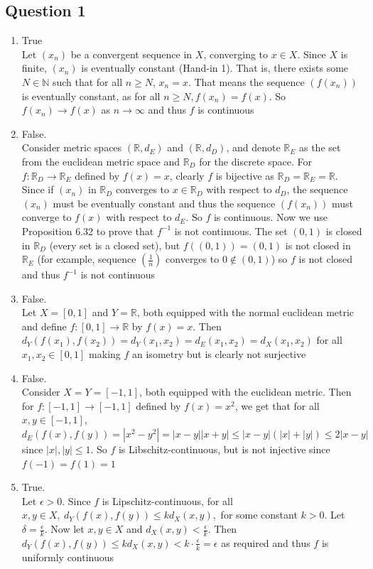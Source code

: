 \documentclass[letterpaper, 11pt]{article}
\newcommand{\R}{\mathbb{R}}   %
\newcommand{\N}{\mathbb{N}}   %
\newcommand{\1}{\mathds{1}}	%
\theoremstyle{definition}
\begin{document}
\subsection*{Question 1}

\begin{enumerate}[label=(\alph*)]
\item True \\Let $(x_n)$ be a convergent sequence in $X$, converging to $x\in X$. Since $X$ is finite, $(x_n)$ is eventually constant (Hand-in 1). That is, there exists some $N\in \N$ such that for all $n \ge N$, $x_n = x$. That means the sequence $(f(x_n))$ is eventually constant, as for all $n\ge N, f(x_n) = f(x)$. So $f(x_n) \to f(x)$ as $n \to \infty$ and thus $f$ is continuous

\item False. \\ Consider metric spaces $(\R, d_E)$ and $(\R, d_D)$, and denote $\R_E$ as the set from the euclidean metric space and $\R_D$ for the discrete space. For $f: \R_D \to \R_E$ defined by $f(x) = x$, clearly $f$ is bijective as $\R _D = \R_E = \R$. Since if $(x_n)$ in $\R_D$ converges to $x \in \R_D$ with respect to $d_D$, the sequence $(x_n)$ must be eventually constant and thus the sequence $(f(x_n))$ must converge to $f(x)$ with respect to $d_E$. So $f$ is continuous. Now we use Proposition 6.32 to prove that $f^{-1}$ is not continuous. The set $(0,1)$ is closed in $\R_D$ (every set is a closed set), but $f((0,1)) = (0,1)$ is not closed in $\R_E$ (for example, sequence $(\frac{1}{n})$ converges to $0 \notin (0,1)$) so $f$ is not closed and thus $f^{-1}$ is not continuous

\item False. \\Let $X = [0,1]$ and $Y = \R$, both equipped with the normal euclidean metric and define $f:[0,1] \to \R$  by $f(x) = x$. Then $d_Y (f(x_1), f(x_2)) = d_Y (x_1, x_2) = d_E(x_1, x_2) = d_X(x_1, x_2) $ for all $x_1, x_2 \in [0,1]$ making $f$ an isometry but is clearly not surjective

\item False. \\Consider $X = Y = [-1,1]$, both equipped with the euclidean metric. Then for $f: [-1,1] \to [-1,1]$ defined by $f(x) = x^2$, we get that for all $x,y \in [-1,1]$, $d_E (f(x), f(y)) = |x^2 - y^2| = |x-y| |x+y| \le |x-y|(|x| + |y|) \le 2 |x-y|$ since $|x|, |y| \le 1$. So $f$ is Libschitz-continuous, but is not injective since $f(-1)=f(1)=1$

\item True. \\Let $\epsilon > 0$. Since $f$ is Lipschitz-continuous, for all $x,y \in X, \ d_Y(f(x), f(y)) \le kd_X (x,y), $ for some constant $k>0$. Let $\delta  = \frac{\epsilon}{k}$. Now let $x,y \in X$ and $d_X(x,y) < \frac{\epsilon}{k}$. Then $d_Y(f(x), f(y)) \le kd_X (x,y) < k \cdot \frac{\epsilon}{k} = \epsilon$ as required and thus $f$ is uniformly continuous

\end{enumerate}
\newpage
\end{document}
